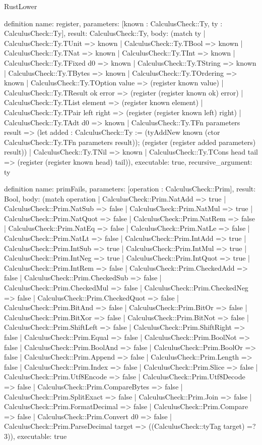 \begin{lexlean}{RustLower}
\begin{semanticmodule}
definition{
  name: register,
  parameters: [known : CalculusCheck::Ty, ty : CalculusCheck::Ty],
  result: CalculusCheck::Ty,
  body: (match ty
    | CalculusCheck::Ty.TUnit => known
    | CalculusCheck::Ty.TBool => known
    | CalculusCheck::Ty.TNat => known
    | CalculusCheck::Ty.TInt => known
    | CalculusCheck::Ty.TFixed d0 => known
    | CalculusCheck::Ty.TString => known
    | CalculusCheck::Ty.TBytes => known
    | CalculusCheck::Ty.TOrdering => known
    | CalculusCheck::Ty.TOption value => (register known value)
    | CalculusCheck::Ty.TResult ok error => (register (register known ok) error)
    | CalculusCheck::Ty.TList element => (register known element)
    | CalculusCheck::Ty.TPair left right => (register (register known left) right)
    | CalculusCheck::Ty.TAdt d0 => known
    | CalculusCheck::Ty.TFn parameters result => (let added : CalculusCheck::Ty := (tyAddNew known (ctor CalculusCheck::Ty.TFn parameters result)); (register (register added parameters) result))
    | CalculusCheck::Ty.TNil => known
    | CalculusCheck::Ty.TCons head tail => (register (register known head) tail)),
  executable: true,
  recursive_argument: ty
}

definition{
  name: primFails,
  parameters: [operation : CalculusCheck::Prim],
  result: Bool,
  body: (match operation
    | CalculusCheck::Prim.NatAdd => true
    | CalculusCheck::Prim.NatSub => false
    | CalculusCheck::Prim.NatMul => true
    | CalculusCheck::Prim.NatQuot => false
    | CalculusCheck::Prim.NatRem => false
    | CalculusCheck::Prim.NatEq => false
    | CalculusCheck::Prim.NatLe => false
    | CalculusCheck::Prim.NatLt => false
    | CalculusCheck::Prim.IntAdd => true
    | CalculusCheck::Prim.IntSub => true
    | CalculusCheck::Prim.IntMul => true
    | CalculusCheck::Prim.IntNeg => true
    | CalculusCheck::Prim.IntQuot => true
    | CalculusCheck::Prim.IntRem => false
    | CalculusCheck::Prim.CheckedAdd => false
    | CalculusCheck::Prim.CheckedSub => false
    | CalculusCheck::Prim.CheckedMul => false
    | CalculusCheck::Prim.CheckedNeg => false
    | CalculusCheck::Prim.CheckedQuot => false
    | CalculusCheck::Prim.BitAnd => false
    | CalculusCheck::Prim.BitOr => false
    | CalculusCheck::Prim.BitXor => false
    | CalculusCheck::Prim.BitNot => false
    | CalculusCheck::Prim.ShiftLeft => false
    | CalculusCheck::Prim.ShiftRight => false
    | CalculusCheck::Prim.Equal => false
    | CalculusCheck::Prim.BoolNot => false
    | CalculusCheck::Prim.BoolAnd => false
    | CalculusCheck::Prim.BoolOr => false
    | CalculusCheck::Prim.Append => false
    | CalculusCheck::Prim.Length => false
    | CalculusCheck::Prim.Index => false
    | CalculusCheck::Prim.Slice => false
    | CalculusCheck::Prim.Utf8Encode => false
    | CalculusCheck::Prim.Utf8Decode => false
    | CalculusCheck::Prim.CompareBytes => false
    | CalculusCheck::Prim.SplitExact => false
    | CalculusCheck::Prim.Join => false
    | CalculusCheck::Prim.FormatDecimal => false
    | CalculusCheck::Prim.Compare => false
    | CalculusCheck::Prim.Convert d0 => false
    | CalculusCheck::Prim.ParseDecimal target => ((CalculusCheck::tyTag target) =? 3)),
  executable: true
}


\end{semanticmodule}
\end{lexlean}
